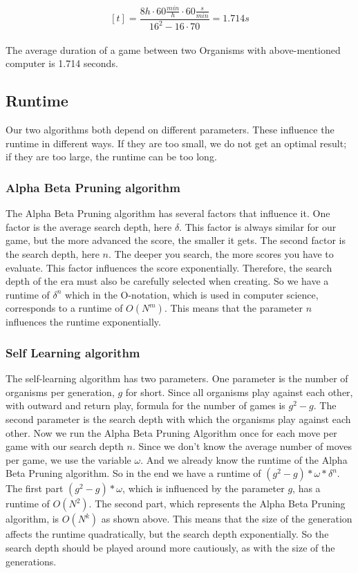 $$ [t] =  \frac{8h \cdot 60\frac{min}{h} \cdot 60\frac{s}{min}}{16^2 - 16 \cdot 70} = 1.714s$$\\
The average duration of a game between two Organisms with above-mentioned computer is 1.714 seconds.

\subsection{Runtime}
Our two algorithms both depend on different parameters. These influence the runtime in different ways. If they are too small, we do not get an optimal result; if they are too large, the runtime can be too long.

\subsubsection{Alpha Beta Pruning algorithm}
The Alpha Beta Pruning algorithm has several factors that influence it. One factor is the average search depth, here $\delta$. This factor is always similar for our game, but the more advanced the score, the smaller it gets. The second factor is the search depth, here $n$. The deeper you search, the more scores you have to evaluate. This factor influences the score exponentially. Therefore, the search depth of the era must also be carefully selected when creating. So we have a runtime of $\delta^n$ which in the O-notation, which is used in computer science, corresponds to a runtime of $O(N^{m})$. This means that the parameter $n$ influences the runtime exponentially.

\subsubsection{Self Learning algorithm}
The self-learning algorithm has two parameters. One parameter is the number of organisms per generation, $g$ for short. Since all organisms play against each other, with outward and return play, formula for the number of games is $g^2 - g$.  The second parameter is the search depth with which the organisms play against each other. Now we run the Alpha Beta Pruning Algorithm once for each move per game with our search depth $n$. Since we don't know the average number of moves per game, we use the variable $\omega$.  And we already know the runtime of the Alpha Beta Pruning algorithm. So in the end we have a runtime of $(g^2 - g) * \omega * \delta^n$. The first part $(g^2 - g) * \omega$, which is influenced by the parameter $g$, has a runtime of $O(N^2)$. The second part, which represents the Alpha Beta Pruning algorithm, is $O(N^k)$ as shown above. This means that the size of the generation affects the runtime quadratically, but the search depth exponentially. So the search depth should be played around more cautiously, as with the size of the generations. 

